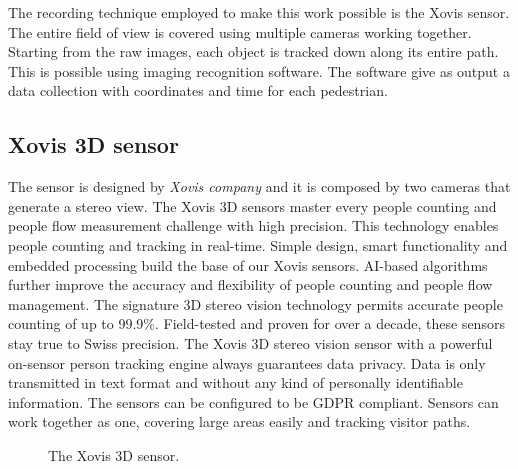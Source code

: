 \documentclass[class=article, crop=false]{standalone}
\begin{document}
The recording technique employed to make this work possible is the Xovis sensor.
The entire field of view is covered using multiple cameras working together.
Starting from the raw images, each object is tracked down along its entire path.
This is possible using imaging recognition software.
The software give as output a data collection with coordinates and time for each pedestrian.


\subsection{Xovis 3D sensor}  %
The sensor is designed by \emph{Xovis company} and it is composed by two cameras that generate a stereo view.
The Xovis 3D sensors master every people counting and people flow measurement challenge with high precision. 
This technology enables people counting and tracking in real-time. 
Simple design, smart functionality and embedded processing build the base of our Xovis sensors. 
AI-based algorithms further improve the accuracy and flexibility of people counting and people flow management.
The signature 3D stereo vision technology permits accurate people counting of up to 99.9\%. 
Field-tested and proven for over a decade, these sensors stay true to Swiss precision.
The Xovis 3D stereo vision sensor with a powerful on-sensor person tracking engine always guarantees data privacy. 
Data is only transmitted in text format and without any kind of personally identifiable information. 
The sensors can be configured to be GDPR compliant.
Sensors can work together as one, covering large areas easily and tracking visitor paths.
\begin{figure}[h]
    \centering
    \quad\quad
    \caption{The Xovis 3D sensor.}
    \label{fig:Xovis_sensor}
\end{figure}

 
\end{document}
